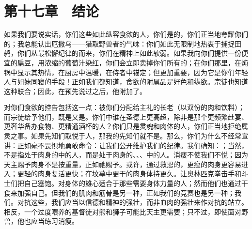 
\section{第十七章　结论}

如果我们要说实话，你们这些如此纵容食欲的人，你们是的，你们正当地夸耀你们的；我总能认出厄撒乌——猎取野兽者的气味：你们如此无限制地热衷于捕捉田鸫，你们从最松懈纪律的而来，你们在精神上如此软弱。如果我向你们提供一份便宜的扁豆，用浓缩的葡萄汁染红，你们会立即卖掉你们所有的；在你们那里，在炖锅中显示其热情，在厨房中温暖，在侍者中锚定；但更加重要，因为它是你们年轻人与姐妹同寝的手段！正如我们都知道，食欲的附属品是好色和纵欲。宗徒也知道这种联合；因此，在预先说过之后，他附加了。\par

对你们食欲的控告包括这一点：被你们分配给主礼的长老（以双份的肉和饮料）；而宗徒给予他们，既是又是。你们中谁在圣德上更高超，除非是那个更频繁赴宴、更奢华备办食物、更精通酒杯的人？你们只是灵魂和肉体的人，你们正当地拒绝属灵之事。如果先知们取悦于人，那我的先知们就不是。那么，你们为什么不经常宣讲：正如毫不畏惧地勇敢命令：让我们公开维护我们的纪律。我们确知：；当然，不是指处于肉身的中的人，而是处于肉身的、、、中的人。消瘦不使我们不悦；因为天主赐予肉身不是按重量，正如祂赐予。或许，通过救恩的，更瘦的肉身更容易进入；更轻的肉身复活更快；在坟墓中更干的肉身体持更久。让奥林匹克拳击手和斗士们把自己塞饱。对身体的雄心适合于那些需要身体力量的人；然而他们也通过干食来加强自己。但我们的肌肉和筋骨是另一种，正如我们的竞赛也是另一种；我们。对抗这些，我们应当以信德和精神的强壮，而非血肉的强壮来作对抗的站立。相反，一个过度喂养的基督徒对熊和狮子可能比天主更需要；只不过，即使面对野兽，他也应当练习消瘦。\par

